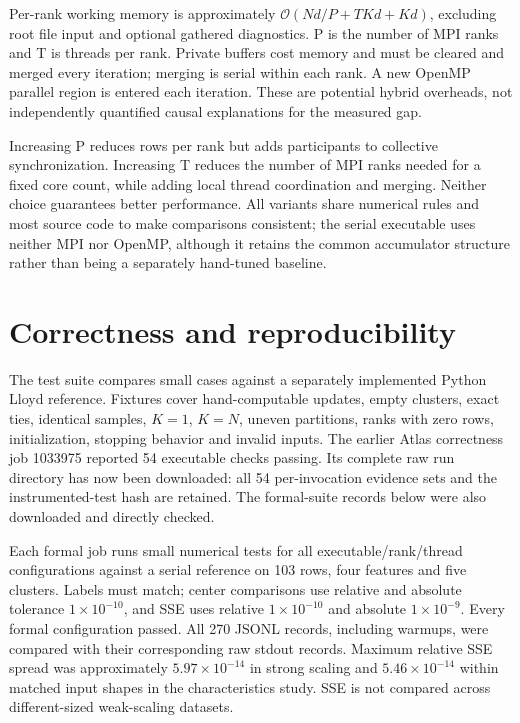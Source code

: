 \documentclass[conference,a4paper,10pt]{IEEEtran}
\begin{document}
Per-rank working memory is approximately $\mathcal{O}(Nd/P+TKd+Kd)$, excluding root file input and optional gathered diagnostics. P is the number of MPI ranks and T is threads per rank. Private buffers cost memory and must be cleared and merged every iteration; merging is serial within each rank. A new OpenMP parallel region is entered each iteration. These are potential hybrid overheads, not independently quantified causal explanations for the measured gap.

Increasing P reduces rows per rank but adds participants to collective synchronization. Increasing T reduces the number of MPI ranks needed for a fixed core count, while adding local thread coordination and merging. Neither choice guarantees better performance. All variants share numerical rules and most source code to make comparisons consistent; the serial executable uses neither MPI nor OpenMP, although it retains the common accumulator structure rather than being a separately hand-tuned baseline.

\section{Correctness and reproducibility}

The test suite compares small cases against a separately implemented Python Lloyd reference. Fixtures cover hand-computable updates, empty clusters, exact ties, identical samples, $K=1$, $K=N$, uneven partitions, ranks with zero rows, initialization, stopping behavior and invalid inputs. The earlier Atlas correctness job 1033975 reported 54 executable checks passing. Its complete raw run directory has now been downloaded: all 54 per-invocation evidence sets and the instrumented-test hash are retained. The formal-suite records below were also downloaded and directly checked.

Each formal job runs small numerical tests for all executable/rank/thread configurations against a serial reference on 103 rows, four features and five clusters. Labels must match; center comparisons use relative and absolute tolerance $1\times10^{-10}$, and SSE uses relative $1\times10^{-10}$ and absolute $1\times10^{-9}$. Every formal configuration passed. All 270 JSONL records, including warmups, were compared with their corresponding raw stdout records. Maximum relative SSE spread was approximately $5.97\times10^{-14}$ in strong scaling and $5.46\times10^{-14}$ within matched input shapes in the characteristics study. SSE is not compared across different-sized weak-scaling datasets.
\end{document}
